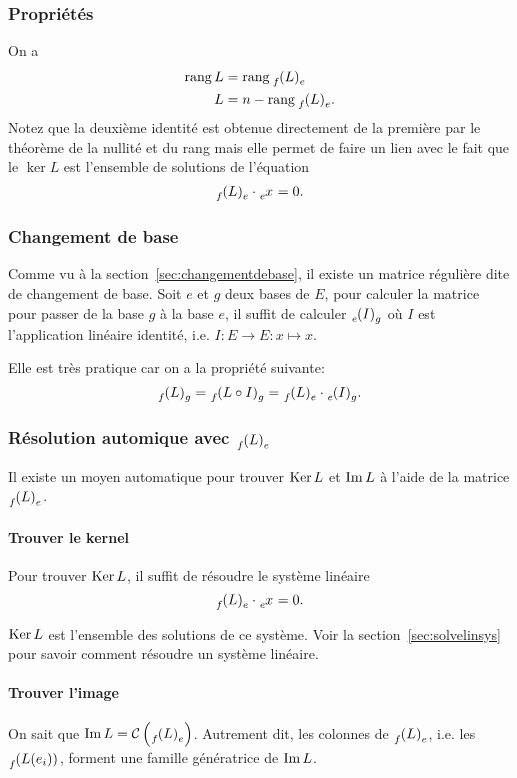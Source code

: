 \subsubsection{Propriétés}
On a
\begin{align*}
  \newrang L & = \newrang \fle\\
  \null L & = n - \newrang \fle.
\end{align*}
Notez que la deuxième identité est obtenue directement
de la première par le théorème de la nullité et du rang
mais elle permet de faire un lien avec le fait que
le $\ker L$ est l'ensemble de solutions de l'équation
\[ \fle \cdot \tensor*[_e]{x}{} = 0. \]

\subsubsection{Changement de base}
Comme vu à la section~\ref{sec:changementdebase},
il existe un matrice régulière dite de changement de base.
Soit $e$ et $g$ deux bases de $E$, pour calculer
la matrice pour passer de la base $g$ à la base $e$,
il suffit de calculer
$\tensor*[_e]{(I)}{_g}$
où $I$ est l'application linéaire identité, i.e.
$I : E \to E : x \mapsto x$.

Elle est très pratique car on a la propriété suivante:
\[ \tensor*[_f]{(L)}{_g} = \tensor*[_f]{(L \circ I)}{_g}
= \fle \cdot \tensor*[_e]{(I)}{_g}. \]

\subsubsection{Résolution automique avec $\fle$}
Il existe un moyen automatique pour trouver $\operatorname{Ker} L$ et $\operatorname{Im} L$
à l'aide de la matrice $\fle$.

\paragraph{Trouver le kernel}
Pour trouver $\operatorname{Ker} L$, il suffit de résoudre le système linéaire
\[ \fle \cdot \tensor*[_e]{x}{} = 0. \]

$\operatorname{Ker} L$ est l'ensemble des solutions de ce système.
Voir la section~\ref{sec:solvelinsys} pour savoir comment résoudre
un système linéaire.

\paragraph{Trouver l'image}
On sait que $\newim L = \mathcal{C} \left(\fle\right)$.
Autrement dit, les colonnes de $\fle$, i.e. les
$\tensor*[_f]{(L(e_i))}{}$, forment une famille génératrice de $\operatorname{Im} L$.

